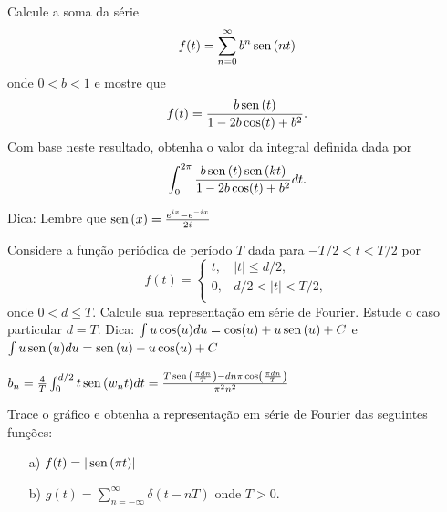 \begin{Exercise}Calcule a soma da série
\begin{equation}f(t)=\sum_{n=0}^\infty b^{n}\operatorname{sen}\,(nt)\end{equation}
onde $0<b<1$ e mostre que
\begin{equation}f(t)=\frac{b\operatorname{sen}\,(t)}{1-2b\cos(t)+b^2}.\end{equation}
Com base neste resultado, obtenha o valor da integral definida dada por
\begin{equation}\int_0^{2\pi}\frac{b\operatorname{sen}\,(t)\operatorname{sen}\,(kt)}{1-2b\cos(t)+b^2}dt.\end{equation}
\end{Exercise}
\begin{Answer}
 Dica: Lembre que $\operatorname{sen}\,(x)=\frac{e^{ix}-e^{-ix}}{2i}$
\end{Answer}
\begin{Exercise}Considere a função periódica de período $T$ dada para $-T/2<t<T/2$ por
$$f(t)=\left\{
\begin{array}{lc}
t,&|t|\leq d/2,\\
0,&d/2<|t|<T/2,\\
\end{array}
\right.$$
onde $0<d\leq T$. Calcule sua representação em série de Fourier. Estude o caso particular $d=T$. Dica: $\int u\cos(u)du=\cos(u)+u\operatorname{sen}\,(u)+C$ e $\int u\operatorname{sen}\,(u)du=\operatorname{sen}\,(u)-u\cos(u)+C$
 \end{Exercise}
\begin{Answer}
 $
b_n=\frac{4}{T}\int_{0}^{d/2}t\operatorname{sen}\,(w_nt)dt=\frac{T\operatorname{sen}\,\left(\frac{\pi d n}{T}\right)-dn\pi\cos\left(\frac{\pi d n}{T}\right)}{\pi^2 n^2}
$
\end{Answer}
\begin{Exercise}{\label{Fourier_8}} Trace o gráfico e obtenha a representação em série de Fourier das seguintes funções:
\begin{itemize}
 \item [a)] $f(t)=|\operatorname{sen}\,(\pi t)|$
 \item [b)] $g(t)=\sum_{n=-\infty}^\infty \delta(t-nT)$ onde $T>0$.
\end{itemize}
\end{Exercise}
